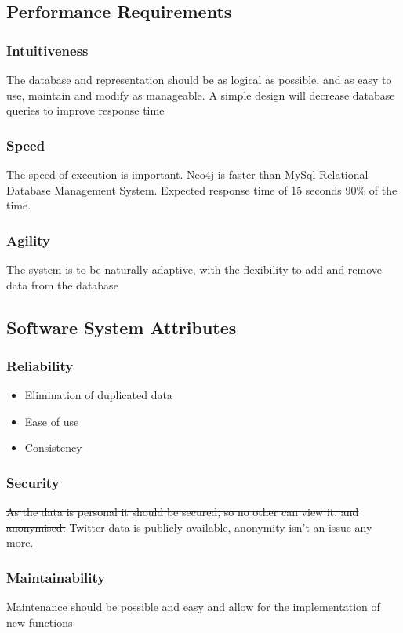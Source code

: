 \documentclass[11pt]{article}
\begin{document}
\subsection{Performance Requirements}
\subsubsection{Intuitiveness}
The database and representation should be as logical as possible, and as easy to use, maintain and modify as manageable. 
A simple design will decrease database queries to improve response time

\subsubsection{Speed}
The speed of execution is important. Neo4j is faster than MySql Relational Database Management System. Expected response time of 15 seconds 90\% of the time.

\subsubsection{Agility}
The system is to be naturally adaptive, with the flexibility to add and remove data from the database

\subsection{Software System Attributes}
\subsubsection{Reliability}
\begin{itemize}
\item Elimination of duplicated data
\item Ease of use
\item Consistency
\end{itemize}

\subsubsection{Security}
\st{As the data is personal it should be secured, so no other can view it, and anonymised.}
Twitter data is publicly available, anonymity isn't an issue any more.


\subsubsection{Maintainability}
Maintenance should be possible and easy and allow for the implementation of new functions
\end{document}
